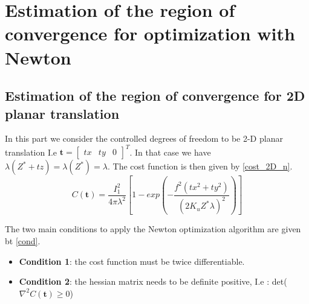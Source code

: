 \section{Estimation of the region of convergence for optimization with Newton}
\subsection{Estimation of the region of convergence for 2D planar translation}\label{cost_2d_sec}
In this part we consider the controlled degrees of freedom to be 2-D planar translation I.e $\textbf{t} = \begin{bmatrix}
    tx & ty & 0
\end{bmatrix}^{T}$. In that case we have $\lambda(Z^{*}+tz) = \lambda(Z^{*}) = \lambda$. The cost function is then given by \eqref{cost_2D_n}.
\begin{equation}
    C(\textbf{t}) = \frac{I^{2}_{1}}{4\pi\lambda^{2}}\left[1 - exp\left(-\frac{f^{2}(tx^{2}+ty^{2})}{(2K_{u}Z^{*}\lambda)^{2}}\right)\right]
    \label{cost_2D_n}
\end{equation}

The two main conditions to apply the Newton optimization algorithm are given bt \ref{cond}.
\begin{itemize}\label{cond}
    \item \textbf{Condition 1}: the cost function must be twice differentiable.
    \item \textbf{Condition 2}: the hessian matrix needs to be definite positive, I.e : det($\nabla^{2}C(\textbf{t}) \ge 0$)
\end{itemize}
 
